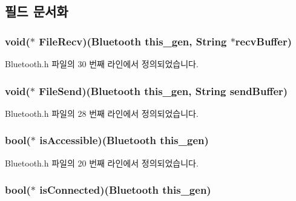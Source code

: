 \subsection{필드 문서화}
\hypertarget{struct___bluetooth_a7c339952703ec4aa063f9db4a8561b85}{
\subsubsection[{File\-Recv}]{\setlength{\rightskip}{0pt plus 5cm}void($\ast$  File\-Recv)({\bf Bluetooth} this\-\_\-gen, {\bf String} $\ast$recv\-Buffer)}}\label{struct___bluetooth_a7c339952703ec4aa063f9db4a8561b85}


Bluetooth.\-h 파일의 30 번째 라인에서 정의되었습니다.

\hypertarget{struct___bluetooth_aa113a2cd73c6888e3a7d4694c6d626e5}{
\subsubsection[{File\-Send}]{\setlength{\rightskip}{0pt plus 5cm}void($\ast$  File\-Send)({\bf Bluetooth} this\-\_\-gen, {\bf String} send\-Buffer)}}\label{struct___bluetooth_aa113a2cd73c6888e3a7d4694c6d626e5}


Bluetooth.\-h 파일의 28 번째 라인에서 정의되었습니다.

\hypertarget{struct___bluetooth_a4d17357ef3f36198ec75747159ba463e}{
\subsubsection[{is\-Accessible}]{\setlength{\rightskip}{0pt plus 5cm}bool($\ast$  is\-Accessible)({\bf Bluetooth} this\-\_\-gen)}}\label{struct___bluetooth_a4d17357ef3f36198ec75747159ba463e}


Bluetooth.\-h 파일의 20 번째 라인에서 정의되었습니다.

\hypertarget{struct___bluetooth_afaf7348f13265482f31f6bb326de23d3}{
\subsubsection[{is\-Connected}]{\setlength{\rightskip}{0pt plus 5cm}bool($\ast$  is\-Connected)({\bf Bluetooth} this\-\_\-gen)}}\label{struct___bluetooth_afaf7348f13265482f31f6bb326de23d3}


